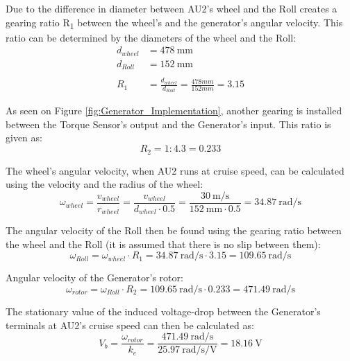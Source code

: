 Due to the difference in diameter between AU2's wheel and the Roll creates a gearing ratio R\textsubscript{1} between the wheel's and the generator's angular velocity. This ratio can be determined by the diameters of the wheel and the Roll:
\begin{equation}
	\begin{split}
		d_{wheel} &= \SI{478}{\milli \meter}\\
		d_{Roll} &= \SI{152}{\milli \meter}\\
		\\
		R_1 &= \frac{d_{wheel}}{d_{Roll}} = \frac{478 mm}{152 mm} = 3.15
	\end{split}
\end{equation}

As seen on Figure \vref{fig:Generator_Implementation}, another gearing is installed between the Torque Sensor's output and the Generator's input. This ratio is given as:
\begin{equation}
	R_2 = 1:4.3 = 0.233
\end{equation}

The wheel's angular velocity, when AU2 runs at cruise speed, can be calculated using the velocity and the radius of the wheel:
\begin{equation}
	\omega_{wheel} = \frac{v_{wheel}}{r_{wheel}} = \frac{v_{wheel}}{d_{wheel} \cdot 0.5} = \frac{\SI[per-mode=fraction]{30}{\meter \per \second}}{\SI{152}{\milli \meter} \cdot 0.5} = \SI[per-mode=fraction]{34.87}{\radian \per \second}
\end{equation}

The angular velocity of the Roll then be found using the gearing ratio between the wheel and the Roll (it is assumed that there is no slip between them):
\begin{equation}
		\omega_{Roll} = \omega_{wheel} \cdot R_1 = \SI[per-mode=fraction]{34.87}{\radian \per \second} \cdot 3.15 = \SI[per-mode=fraction]{109.65}{\radian \per \second}
\end{equation}

Angular velocity of the Generator's rotor:
\begin{equation}
		\omega_{rotor} = \omega_{Roll} \cdot R_2 = \SI[per-mode=fraction]{109.65}{\radian \per \second} \cdot 0.233 = \SI[per-mode=fraction]{471.49}{\radian \per \second}
\end{equation}

The stationary value of the induced voltage-drop between the Generator's terminals at AU2's cruise speed can then be calculated as:
\begin{equation}
		V_b = \frac{\omega_{rotor}}{k_e} = \frac{\SI[per-mode=fraction]{471.49}{\radian \per \second}}{\SI[per-mode=fraction]{25.97}{\radian \per \second \per \volt}} = \SI{18.16}{\volt}
\end{equation}

